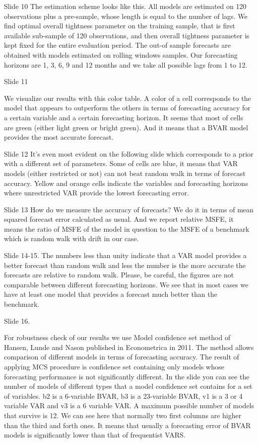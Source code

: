 \documentclass[12pt,a4paper,english,fleqn,oneside,openany]{article}
\begin{document}
Slide 10
The estimation scheme looks like this. All models are estimated on 120 observations plus a pre-sample, whose length is equal to the number of lags. We find optimal overall tightness parameter on the training sample, that is first available sub-sample of 120 observations, and then overall tightness parameter is kept fixed for the entire evaluation period. The out-of sample forecasts are obtained with models estimated on rolling windows samples. Our forecasting horizons are 1, 3, 6, 9 and 12 months and we take all possible lags from 1 to 12. 

Slide 11

We visualize our results with this color table. A color of a cell corresponds to the model that appears to outperform the others in terms of forecasting accuracy for a certain variable and a certain forecasting horizon. It seems that most of cells are green (either light green or bright green). And it means that a BVAR model provides the most accurate forecast. 

Slide 12
It's even most evident on the following slide which corresponds to a prior with a different set of parameters. Some of cells are blue, it means that VAR models (either restricted or not) can not beat random walk in terms of forecast accuracy. Yellow and orange cells indicate the variables and forecasting horizons where unrestricted VAR provide the lowest forecasting error.      

Slide 13
How do we measure the accuracy of forecasts? We do it in terms of mean squared forecast error calculated as usual. And we report relative MSFE, it means the ratio of MSFE of the model in question to the MSFE of a benchmark which is random walk  with drift in our case. 

Slide 14-15.
The numbers less than unity indicate that a VAR model provides a better forecast than random walk and less the number is the more accurate the forecasts are relative to random walk.  Please, be careful, the figures are not comparable between different forecasting horizons. We see that in most cases we have at least one model that provides a forecast much better than the benchmark. 

Slide 16.
 
For robustness check of our results we use Model confidence set method of Hansen, Lunde and Nason  published in Econometrica in 2011. The method allows comparison of different models in terms of forecasting accuracy. The result of applying MCS procedure is confidence set containing only models whose forecasting performance is not significantly different. In the slide you can see the number of models of different types that a model confidence set contains for a set of variables. b2 is a 6-variable BVAR, b3 is a 23-variable BVAR, v1 is a 
 3 or 4 variable VAR and v3 is a 6 variable VAR. A maximum possible number of models that survive is 12. We can see here that normally two first columns are higher than the third and forth ones. It means that usually a forecasting error of BVAR models is significantly lower than that of frequentist VARS.  
 
\end{document}
